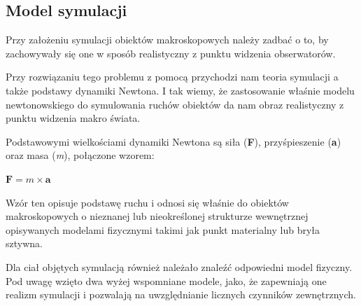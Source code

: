 \subsection{Model symulacji}
\par{
Przy założeniu symulacji obiektów makroskopowych należy zadbać o to, by zachowywały się one w sposób realistyczny z punktu widzenia obserwatorów.
}
\par{
Przy rozwiązaniu tego problemu z pomocą przychodzi nam teoria symulacji a także podstawy dynamiki Newtona.
I tak wiemy, że zastosowanie właśnie modelu newtonowskiego do symulowania ruchów obiektów da nam obraz realistyczny z punktu widzenia makro świata.
}
\par{
Podstawowymi wielkościami dynamiki Newtona są siła (\textbf{F}), przyśpieszenie (\textbf{a}) oraz masa (\textit{m}), połączone wzorem:
\begin{center}
$\textbf{F} = m \times \textbf{a}$
\end{center}
Wzór ten opisuje podstawę ruchu i odnosi się właśnie do obiektów makroskopowych o nieznanej lub nieokreślonej strukturze wewnętrznej opisywanych modelami fizycznymi takimi jak punkt materialny lub bryła sztywna.
}
\par{
Dla ciał objętych symulacją również należało znaleźć odpowiedni model fizyczny. Pod uwagę wzięto dwa wyżej wspomniane modele, jako, że zapewniają one realizm symulacji i pozwalają na uwzględnianie licznych czynników zewnętrznych.
}
